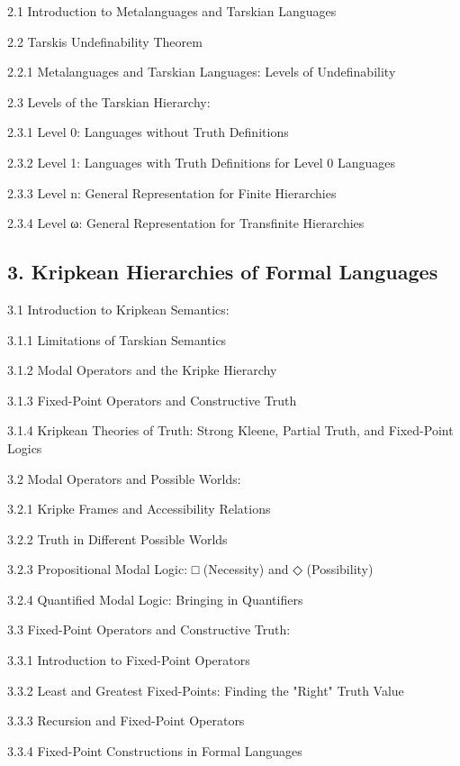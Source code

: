 2.1 Introduction to Metalanguages and Tarskian Languages

2.2 Tarski\textquotesingle s Undefinability Theorem

2.2.1 Metalanguages and Tarskian Languages: Levels of Undefinability

2.3 Levels of the Tarskian Hierarchy:

2.3.1 Level 0: Languages without Truth Definitions

2.3.2 Level 1: Languages with Truth Definitions for Level 0 Languages

2.3.3 Level n: General Representation for Finite Hierarchies

2.3.4 Level ω: General Representation for Transfinite Hierarchies

\hypertarget{kripkean-hierarchies-of-formal-languages}{%
\subsection*{3. Kripkean Hierarchies of Formal
Languages}\label{kripkean-hierarchies-of-formal-languages}}

3.1 Introduction to Kripkean Semantics:

3.1.1 Limitations of Tarskian Semantics

3.1.2 Modal Operators and the Kripke Hierarchy

3.1.3 Fixed-Point Operators and Constructive Truth

3.1.4 Kripkean Theories of Truth: Strong Kleene, Partial Truth, and
Fixed-Point Logics

3.2 Modal Operators and Possible Worlds:

3.2.1 Kripke Frames and Accessibility Relations

3.2.2 Truth in Different Possible Worlds

3.2.3 Propositional Modal Logic: □ (Necessity) and ◇ (Possibility)

3.2.4 Quantified Modal Logic: Bringing in Quantifiers

3.3 Fixed-Point Operators and Constructive Truth:

3.3.1 Introduction to Fixed-Point Operators

3.3.2 Least and Greatest Fixed-Points: Finding the "Right" Truth Value

3.3.3 Recursion and Fixed-Point Operators

3.3.4 Fixed-Point Constructions in Formal Languages

